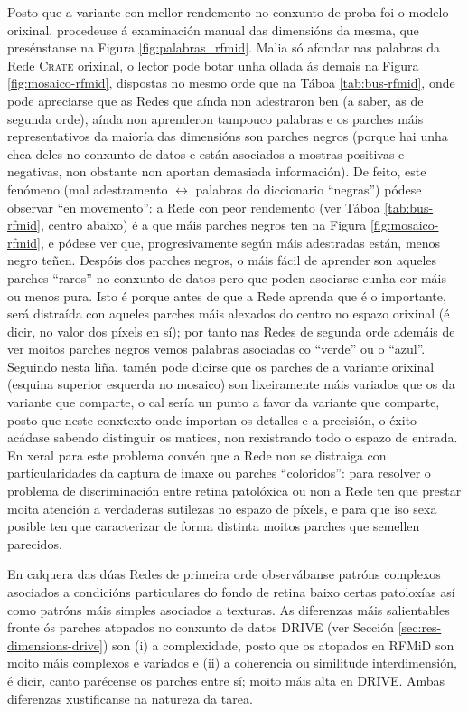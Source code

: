 Posto que a variante con mellor rendemento no conxunto de proba foi o modelo orixinal, procedeuse á examinación manual das dimensións da mesma, que presénstanse na Figura \ref{fig:palabras_rfmid}. Malia só afondar nas palabras da Rede \textsc{Crate} orixinal, o lector pode botar unha ollada ás demais na Figura \ref{fig:mosaico-rfmid}, dispostas no mesmo orde que na Táboa \ref{tab:bus-rfmid}, onde pode apreciarse que as Redes que aínda non adestraron ben (a saber, as de segunda orde), aínda non aprenderon tampouco palabras e os parches máis representativos da maioría das dimensións son parches negros (porque hai unha chea deles no conxunto de datos e están asociados a mostras positivas e negativas, non obstante non aportan demasiada información). De feito, este fenómeno (mal adestramento $\leftrightarrow$ palabras do diccionario ``negras'') pódese observar ``en movemento'': a Rede con peor rendemento (ver Táboa \ref{tab:bus-rfmid}, centro abaixo) é a que máis parches negros ten na Figura \ref{fig:mosaico-rfmid}, e pódese ver que, progresivamente según máis adestradas están, menos negro teñen. Despóis dos parches negros, o máis fácil de aprender son aqueles parches ``raros'' no conxunto de datos pero que poden asociarse cunha cor máis ou menos pura. Isto é porque antes de que a Rede aprenda que é o importante, será distraída con aqueles parches máis alexados do centro no espazo orixinal (é dicir, no valor dos \glspl{píxel} en sí); por tanto nas Redes de segunda orde ademáis de ver moitos parches negros vemos palabras asociadas co ``verde'' ou o ``azul''. Seguindo nesta liña, tamén pode dicirse que os parches de a variante orixinal (esquina superior esquerda no mosaico) son lixeiramente máis variados que os da variante que comparte, o cal sería un punto a favor da variante que comparte, posto que neste conxtexto onde importan os detalles e a precisión, o éxito acádase sabendo distinguir os matices, non rexistrando todo o espazo de entrada. En xeral para este problema convén que a Rede non se distraiga con particularidades da captura de imaxe ou parches ``coloridos'': para resolver o problema de discriminación entre retina patolóxica ou non a Rede ten que prestar moita atención a verdaderas sutilezas no espazo de \glspl{píxel}, e para que iso sexa posible ten que caracterizar de forma distinta moitos parches que semellen parecidos.

En calquera das dúas Redes de primeira orde observábanse patróns complexos asociados a condicións particulares do fondo de retina baixo certas patoloxías así como patróns máis simples asociados a texturas. As diferenzas máis salientables fronte ós parches atopados no conxunto de datos DRIVE (ver Sección \ref{sec:res-dimensions-drive}) son (i) a complexidade, posto que os atopados en RFMiD son moito máis complexos e variados e (ii) a coherencia ou similitude interdimensión, é dicir, canto parécense os parches entre sí; moito máis alta en DRIVE. Ambas diferenzas xustificanse na natureza da tarea.

